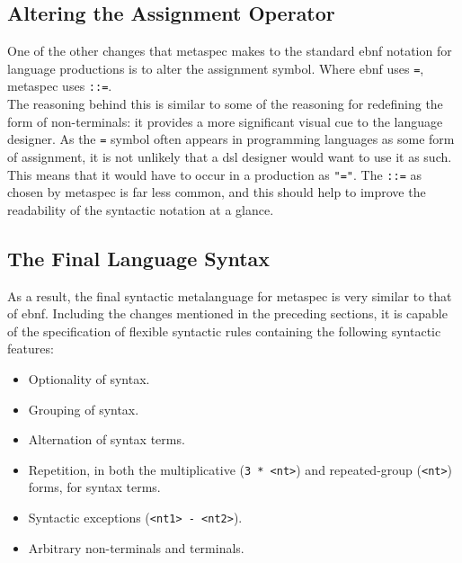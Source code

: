 
\subsection{Altering the Assignment Operator} %
\label{sub:altering_the_assignment_operator}
One of the other changes that \gls{metaspec} makes to the standard \gls{ebnf} notation for language productions is to alter the assignment symbol.
Where \gls{ebnf} uses \texttt{=}, \gls{metaspec} uses \texttt{::=}.\\

The reasoning behind this is similar to some of the reasoning for redefining the form of non-terminals: it provides a more significant visual cue to the language designer. 
As the \texttt{=} symbol often appears in programming languages as some form of assignment, it is not unlikely that a \gls{dsl} designer would want to use it as such.
This means that it would have to occur in a production as \texttt{"="}. 
The \texttt{::=} as chosen by \gls{metaspec} is far less common, and this should help to improve the readability of the syntactic notation at a glance. 


\subsection{The Final Language Syntax} %
\label{sub:the_final_language_syntax}
As a result, the final syntactic metalanguage for \gls{metaspec} is very similar to that of \gls{ebnf}.
Including the changes mentioned in the preceding sections, it is capable of the specification of flexible syntactic rules containing the following syntactic features:
\begin{itemize}
    \item Optionality of syntax.
    \item Grouping of syntax.
    \item Alternation of syntax terms.
    \item Repetition, in both the multiplicative (\texttt{3 * <nt>}) and repeated-group (\texttt{{<nt>}}) forms, for syntax terms.
    \item Syntactic exceptions (\texttt{<nt1> - <nt2>}).
    \item Arbitrary non-terminals and terminals.
\end{itemize}

